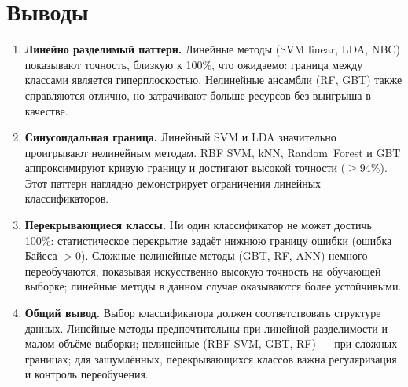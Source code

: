 \documentclass[14pt,a4paper]{extarticle}
\begin{document}
\section*{Выводы}

\begin{enumerate}
  \item \textbf{Линейно разделимый паттерн.}
        Линейные методы (SVM linear, LDA, NBC) показывают точность, близкую
        к 100\%, что ожидаемо: граница между классами является гиперплоскостью.
        Нелинейные ансамбли (RF, GBT) также справляются отлично, но затрачивают
        больше ресурсов без выигрыша в качестве.

  \item \textbf{Синусоидальная граница.}
        Линейный SVM и LDA значительно проигрывают нелинейным методам.
        RBF SVM, kNN, Random~Forest и GBT аппроксимируют кривую границу
        и достигают высокой точности ($\geq 94\%$).
        Этот паттерн наглядно демонстрирует ограничения линейных классификаторов.

  \item \textbf{Перекрывающиеся классы.}
        Ни один классификатор не может достичь 100\%: статистическое перекрытие
        задаёт нижнюю границу ошибки (ошибка Байеса $> 0$).
        Сложные нелинейные методы (GBT, RF, ANN) немного переобучаются,
        показывая искусственно высокую точность на обучающей выборке;
        линейные методы в данном случае оказываются более устойчивыми.

  \item \textbf{Общий вывод.}
        Выбор классификатора должен соответствовать структуре данных.
        Линейные методы предпочтительны при линейной разделимости и малом
        объёме выборки; нелинейные (RBF SVM, GBT, RF) --- при сложных границах;
        для зашумлённых, перекрывающихся классов важна регуляризация и
        контроль переобучения.
\end{enumerate}
\end{document}
